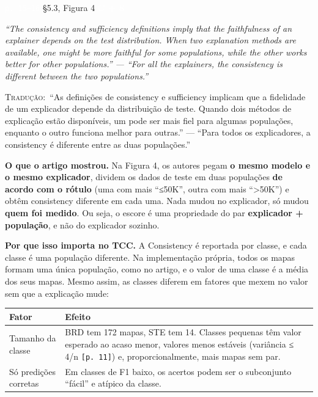 \documentclass[11pt,a4paper]{article}
\newcommand{\metrictag}[2]{{\setlength{\fboxsep}{1.5pt}%
  \ifstrequal{#1}{c}{\colorbox{cC}{\textcolor{white}{\scriptsize\textbf{#2}}}}{%
  \ifstrequal{#1}{s}{\colorbox{cS}{\textcolor{white}{\scriptsize\textbf{#2}}}}{%
  \colorbox{black!60}{\textcolor{white}{\scriptsize\textbf{#2}}}}}}}
\newcommand{\pagechip}[1]{{\setlength{\fboxsep}{1.5pt}\colorbox{cAcc}{\textcolor{white}{\scriptsize\texttt{#1}}}}}
\newenvironment{origquote}{\par\itshape\small}{\par}
\newenvironment{tradquote}{\par\small\textsc{Tradução:}\ }{\par}
\newcommand{\explab}[1]{\par\smallskip{\small\color{cAcc}\textbf{\MakeUppercase{#1}}}\par}
\begin{document}
\begin{citacard}{\pagechip{p. 15–16} §5.3, Figura 4 \metrictag{cs}{C + S}}
\begin{origquote}“The consistency and sufficiency definitions imply that the faithfulness of an explainer depends on the test distribution. When two explanation methods are available, one might be more faithful for some populations, while the other works better for other populations.” — “For all the explainers, the consistency is different between the two populations.”\end{origquote}
\begin{tradquote}“As definições de consistency e sufficiency implicam que a fidelidade de um explicador depende da distribuição de teste. Quando dois métodos de explicação estão disponíveis, um pode ser mais fiel para algumas populações, enquanto o outro funciona melhor para outras.” — “Para todos os explicadores, a consistency é diferente entre as duas populações.”\end{tradquote}
\explab{Explicação}
\textbf{O que o artigo mostrou.} Na Figura 4, os autores pegam \textbf{o mesmo modelo e o mesmo explicador}, dividem os dados de teste em duas populações \textbf{de acordo com o rótulo} (uma com mais “≤50K”, outra com mais “>50K”) e obtêm consistency diferente em cada uma. Nada mudou no explicador, só mudou \textbf{quem foi medido}. Ou seja, o escore é uma propriedade do par \textbf{explicador + população}, e não do explicador sozinho.

\textbf{Por que isso importa no TCC.} A Consistency é reportada por classe, e cada classe é uma população diferente. Na implementação própria, todos os mapas formam uma única população, como no artigo, e o valor de uma classe é a média dos seus mapas. Mesmo assim, as classes diferem em fatores que mexem no valor sem que a explicação mude:

\begin{center}\small
\begin{tabularx}{\linewidth}{lX}
\toprule
\textbf{Fator} & \textbf{Efeito} \\
\midrule
Tamanho da classe & BRD tem 172 mapas, STE tem 14. Classes pequenas têm valor esperado ao acaso menor, valores menos estáveis (variância ≤ 4/n \texttt{[p. 11]}) e, proporcionalmente, mais mapas sem par. \\
Só predições corretas & Em classes de F1 baixo, os acertos podem ser o subconjunto “fácil” e atípico da classe. \\
\bottomrule
\end{tabularx}
\end{center}


\end{citacard}
\end{document}
